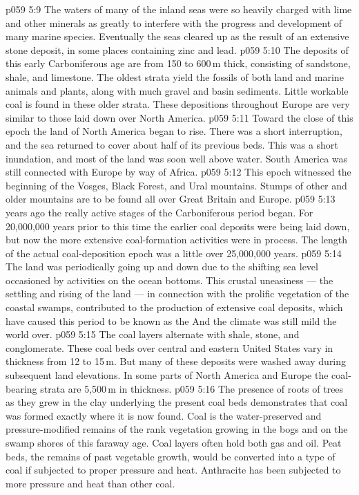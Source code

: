 \vs p059 5:9 The waters of many of the inland seas were so heavily charged with lime and other minerals as greatly to interfere with the progress and development of many marine species. Eventually the seas cleared up as the result of an extensive stone deposit, in some places containing zinc and lead.
\vs p059 5:10 The deposits of this early Carboniferous age are from 150 to 600\,m thick, consisting of sandstone, shale, and limestone. The oldest strata yield the fossils of both land and marine animals and plants, along with much gravel and basin sediments. Little workable coal is found in these older strata. These depositions throughout Europe are very similar to those laid down over North America.
\vs p059 5:11 Toward the close of this epoch the land of North America began to rise. There was a short interruption, and the sea returned to cover about half of its previous beds. This was a short inundation, and most of the land was soon well above water. South America was still connected with Europe by way of Africa.
\vs p059 5:12 This epoch witnessed the beginning of the Vosges, Black Forest, and Ural mountains. Stumps of other and older mountains are to be found all over Great Britain and Europe.
\vs p059 5:13 \pc {} years ago the really active stages of the Carboniferous period began. For 20,000,000 years prior to this time the earlier coal deposits were being laid down, but now the more extensive coal\hyp{}formation activities were in process. The length of the actual coal\hyp{}deposition epoch was a little over 25,000,000 years.
\vs p059 5:14 The land was periodically going up and down due to the shifting sea level occasioned by activities on the ocean bottoms. This crustal uneasiness --- the settling and rising of the land --- in connection with the prolific vegetation of the coastal swamps, contributed to the production of extensive coal deposits, which have caused this period to be known as the  And the climate was still mild the world over.
\vs p059 5:15 The coal layers alternate with shale, stone, and conglomerate. These coal beds over central and eastern United States vary in thickness from 12 to 15\,m. But many of these deposits were washed away during subsequent land elevations. In some parts of North America and Europe the coal\hyp{}bearing strata are 5,500\,m in thickness.
\vs p059 5:16 The presence of roots of trees as they grew in the clay underlying the present coal beds demonstrates that coal was formed exactly where it is now found. Coal is the water\hyp{}preserved and pressure\hyp{}modified remains of the rank vegetation growing in the bogs and on the swamp shores of this faraway age. Coal layers often hold both gas and oil. Peat beds, the remains of past vegetable growth, would be converted into a type of coal if subjected to proper pressure and heat. Anthracite has been subjected to more pressure and heat than other coal.
